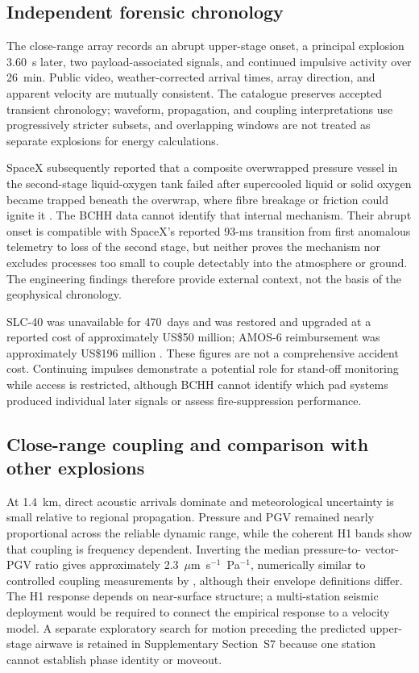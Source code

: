\documentclass[]{seismica}
\begin{document}
\subsection{Independent forensic chronology}

The close-range array records an abrupt upper-stage onset, a principal
explosion 3.60~s later, two payload-associated signals, and continued
impulsive activity over 26~min. Public video, weather-corrected arrival times,
array direction, and apparent velocity are mutually consistent. The catalogue
preserves accepted transient chronology; waveform, propagation, and coupling
interpretations use progressively stricter subsets, and overlapping windows
are not treated as separate explosions for energy calculations.

SpaceX subsequently reported that a composite overwrapped pressure vessel in
the second-stage liquid-oxygen tank failed after supercooled liquid or solid
oxygen became trapped beneath the overwrap, where fibre breakage or friction
could ignite it \citep{spacex_anomaly_2017,nasa_sma_falcon9}. The BCHH data
cannot identify that internal mechanism. Their abrupt onset is compatible with
SpaceX's reported 93-ms transition from first anomalous telemetry to loss of
the second stage, but neither proves the mechanism nor excludes processes too
small to couple detectably into the atmosphere or ground. The engineering
findings therefore provide external context, not the basis of the geophysical
chronology.

SLC-40 was unavailable for 470~days and was restored and upgraded at a reported
cost of approximately US\$50 million; AMOS-6 reimbursement was approximately
US\$196 million \citep{clark_slc40_2017,magan_amos6_2016,
spacex_crs13_2017}. These figures are not a comprehensive accident cost.
Continuing impulses demonstrate a potential role for stand-off monitoring
while access is restricted, although BCHH cannot identify which pad systems
produced individual later signals or assess fire-suppression performance.

\subsection{Close-range coupling and comparison with other explosions}

At 1.4~km, direct acoustic arrivals dominate and meteorological uncertainty is
small relative to regional propagation. Pressure and PGV remained nearly
proportional across the reliable dynamic range, while the coherent H1 bands
show that coupling is frequency dependent. Inverting the median pressure-to-
vector-PGV ratio gives approximately
2.3~$\mu$m~s$^{-1}$~Pa$^{-1}$, numerically similar to controlled coupling
measurements by \citet{novoselov_ground_coupling_2020}, although their envelope
definitions differ. The H1 response depends on near-surface structure; a
multi-station seismic deployment would be required to connect the empirical
response to a velocity model. A separate exploratory search for motion
preceding the predicted upper-stage airwave is retained in Supplementary
Section~S7 because one station cannot establish phase identity or moveout.
\end{document}
